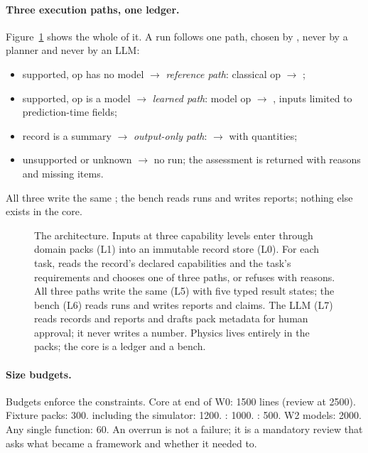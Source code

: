 \documentclass[11pt,a4paper]{article}
\begin{document}
\paragraph{Three execution paths, one ledger.} Figure~\ref{fig:architecture} shows the whole of it. A run follows one path, chosen by , never by a planner and never by an LLM:
\begin{itemize}
\item supported, op has no model $\rightarrow$ \emph{reference path}: classical op $\rightarrow$ ;
\item supported, op is a model $\rightarrow$ \emph{learned path}: model op $\rightarrow$ , inputs limited to prediction-time fields;
\item record is a summary $\rightarrow$ \emph{output-only path}:  $\rightarrow$  with  quantities;
\item unsupported or unknown $\rightarrow$ no run; the assessment is returned with reasons and missing items.
\end{itemize}
All three write the same ; the bench reads runs and writes reports; nothing else exists in the core.

\begin{figure}[htbp]
\centering
\resizebox{\textwidth}{!}{}
\caption{The architecture. Inputs at three capability levels enter through domain packs (L1) into an immutable record store (L0). For each task,  reads the record's declared capabilities and the task's requirements and chooses one of three paths, or refuses with reasons. All three paths write the same  (L5) with five typed result states; the bench (L6) reads runs and writes reports and claims. The LLM (L7) reads records and reports and drafts pack metadata for human approval; it never writes a number. Physics lives entirely in the packs; the core is a ledger and a bench.}
\label{fig:architecture}
\end{figure}

\paragraph{Size budgets.} Budgets enforce the constraints. Core at end of W0: 1500 lines (review at 2500). Fixture packs: 300.  including the simulator: 1200. : 1000. : 500. W2 models: 2000. Any single function: 60. An overrun is not a failure; it is a mandatory review that asks what became a framework and whether it needed to.
\end{document}
